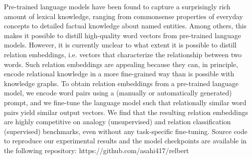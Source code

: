 Pre-trained language models have been found to capture a surprisingly rich amount of lexical knowledge, ranging from commonsense properties of everyday concepts to detailed factual knowledge about named entities. Among others, this makes it possible to distill high-quality word vectors from pre-trained language models. However, it is currently unclear to what extent it is possible to distill relation embeddings, i.e. vectors that characterize the relationship between two words. Such relation embeddings are appealing because they can, in principle, encode relational knowledge in a more fine-grained way than is possible with knowledge graphs. To obtain relation embeddings from a pre-trained language model, we encode word pairs using a (manually or automatically generated) prompt, and we fine-tune the language model such that relationally similar word pairs yield similar output vectors. We find that the resulting relation embeddings are highly competitive on analogy (unsupervised) and relation classification (supervised) benchmarks, even without any task-specific fine-tuning. Source code to reproduce our experimental results and the model checkpoints are available in the following repository: https://github.com/asahi417/relbert
